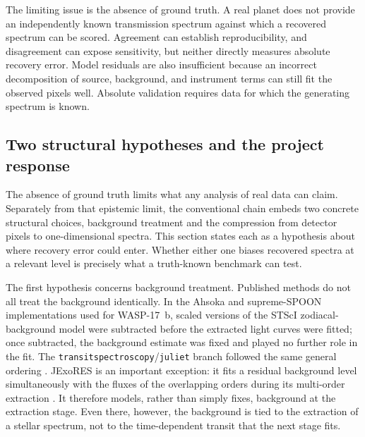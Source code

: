 The limiting issue is the absence of ground truth. A real planet does not
provide an independently known transmission spectrum against which a recovered
spectrum can be scored. Agreement can establish reproducibility, and
disagreement can expose sensitivity, but neither directly measures absolute
recovery error. Model residuals are also insufficient because an incorrect
decomposition of source, background, and instrument terms can still fit the
observed pixels well. Absolute validation requires data for which the generating
spectrum is known.

\subsection{Two structural hypotheses and the project response}
\label{sec:structural-limitations-inference}
\label{sec:structural-limitations}
\label{sec:benchmark-and-nova}


The absence of ground truth limits what any analysis of real data can claim.
Separately from that epistemic limit, the conventional chain embeds two
concrete structural choices, background treatment and the compression from
detector pixels to one-dimensional spectra. This section states each as a
hypothesis about where recovery error could enter. Whether either one biases
recovered spectra at a relevant level is precisely what a truth-known
benchmark can test.


The first hypothesis concerns background treatment. Published methods do not
all treat the background identically. In the Ahsoka and supreme-SPOON
implementations used for WASP-17~b, scaled versions of the STScI
zodiacal-background model were subtracted before the extracted light curves
were fitted; once subtracted, the background estimate was fixed and played no
further role in the fit. The
\texttt{transitspectroscopy}/\texttt{juliet} branch followed the same general
ordering \citep{LouieEtAl2025}. JExoRES is an important exception: it fits a
residual background level simultaneously with the fluxes of the overlapping
orders during its multi-order extraction \citep{HolmbergMadhusudhan2023}. It
therefore models, rather than simply fixes, background at the extraction
stage. Even there, however, the background is tied to the extraction of a
stellar spectrum, not to the time-dependent transit that the next stage fits.

